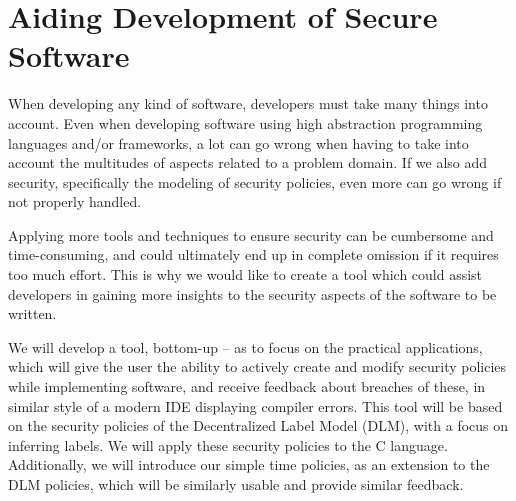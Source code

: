 
\section{Aiding Development of Secure Software}
When developing any kind of software, developers must take many things into account.
Even when developing software using high abstraction programming languages and/or frameworks, a lot can go wrong when having to take into account the multitudes of aspects related to a problem domain.
If we also add security, specifically the modeling of security policies, even more can go wrong if not properly handled.

Applying more tools and techniques to ensure security can be cumbersome and time-consuming, and could ultimately end up in complete omission if it requires too much effort.
This is why we would like to create a tool which could assist developers in gaining more insights to the security aspects of the software to be written.

We will develop a tool, bottom-up -- as to focus on the practical applications, which will give the user the ability to actively create and modify security policies while implementing software, and receive feedback about breaches of these, in similar style of a modern IDE displaying compiler errors.
This tool will be based on the security policies of the Decentralized Label Model (DLM), with a focus on inferring labels.
We will apply these security policies to the C language.
Additionally, we will introduce our simple time policies, as an extension to the DLM policies, which will be similarly usable and provide similar feedback.
